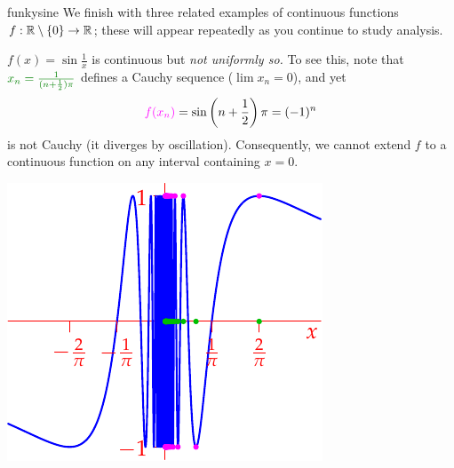 \begin{examples}{}{funkysine}
	We finish with three related examples of continuous functions $f:\mathbb{R}\setminus\{0\}\to\mathbb{R}$; these will appear repeatedly as you continue to study analysis.
	\begin{enumerate}		
		\begin{minipage}[t]{0.6\linewidth}\vspace{0pt}
			\item $f(x)=\sin\frac 1x$ is continuous but \emph{not uniformly so.} To see this, note that $\textcolor{Green}{x_n=\frac 1{(n+\frac 12)\pi}}$ defines a Cauchy sequence ($\lim x_n=0$), and yet
			\[
				\textcolor{Magenta}{f(x_n)}=\sin\left(n+\frac 12\right)\pi=(-1)^n
			\]
			is not Cauchy (it diverges by oscillation). Consequently, we cannot extend $f$ to a continuous function on any interval containing $x=0$.
		\end{minipage}
		\hfill
		\begin{minipage}[t]{0.39\linewidth}\vspace{0pt}
			\flushright\includegraphics[scale=0.95]{unifcontex3}
		\end{minipage}\par
	  

\end{enumerate}
\end{examples}
